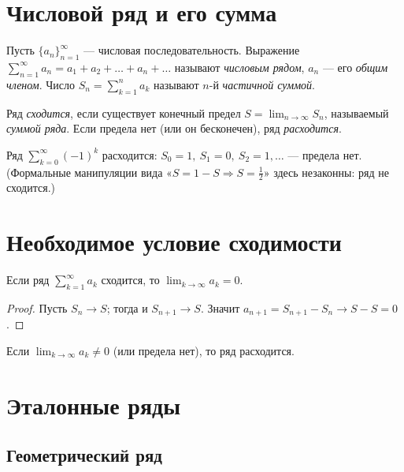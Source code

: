 \section{Числовой ряд и его сумма}

\begin{definition}
Пусть $\{a_n\}_{n=1}^\infty$ — числовая последовательность. Выражение
$\displaystyle\sum_{n=1}^{\infty}a_n=a_1+a_2+\dots+a_n+\dots$ называют \emph{числовым рядом}, $a_n$
— его \emph{общим членом}. Число $\displaystyle S_n=\sum_{k=1}^{n}a_k$ называют $n$-й
\emph{частичной суммой}.
\end{definition}

\begin{definition}
Ряд \emph{сходится}, если существует конечный предел $\displaystyle S=\lim_{n\to\infty}S_n$,
называемый \emph{суммой ряда}. Если предела нет (или он бесконечен), ряд \emph{расходится}.
\end{definition}

\begin{example}
Ряд $\displaystyle\sum_{k=0}^{\infty}(-1)^k$ расходится: $S_0=1,\ S_1=0,\ S_2=1,\dots$ — предела
нет. (Формальные манипуляции вида «$S=1-S\Rightarrow S=\tfrac12$» здесь незаконны: ряд не
сходится.)
\end{example}

\section{Необходимое условие сходимости}

\begin{theorem}
Если ряд $\displaystyle\sum_{k=1}^{\infty}a_k$ сходится, то $\displaystyle\lim_{k\to\infty}a_k=0$.
\end{theorem}

\begin{proof}
Пусть $S_n\to S$; тогда и $S_{n+1}\to S$. Значит $a_{n+1}=S_{n+1}-S_n\to S-S=0$.
\end{proof}

\begin{corollary}
Если $\displaystyle\lim_{k\to\infty}a_k\ne0$ (или предела нет), то ряд расходится.
\end{corollary}

\section{Эталонные ряды}

\subsection{Геометрический ряд}

